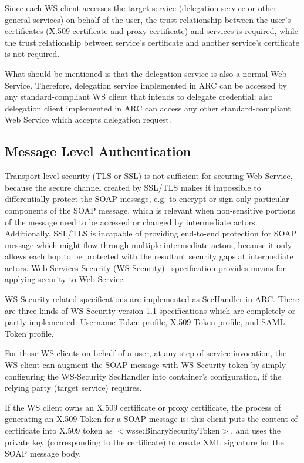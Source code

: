 \documentclass[twocolumn]{svjour3}         %
\begin{document}
Since each WS client accesses the target service (delegation service or other general services) on behalf of the user, the trust relationship between the user's certificates (X.509 certificate and proxy certificate) and services is required, while the trust relationship between service's certificate and another service's certificate is not required.

What should be mentioned is that the delegation service is also a normal Web Service. Therefore, delegation service implemented in ARC can be accessed by any standard-compliant WS client that intends to delegate credential; also delegation client implemented in ARC can access any other standard-compliant Web Service which accepts delegation request.

\subsection{Message Level Authentication}
\label{sec:msgauthn}
Transport level security (TLS or SSL) is not sufficient for securing Web Service, because the secure channel created by SSL/TLS makes it impossible to differentially protect the SOAP message, e.g. to encrypt or sign only particular components of the SOAP message, which is relevant when non-sensitive portions of the message need to be accessed or changed by intermediate actors. Additionally, SSL/TLS is incapable of providing end-to-end protection for SOAP message which might flow through multiple intermediate actors, because it only allows each hop to be protected with the resultant security gaps at intermediate actors. Web Services Security (WS-Security)~\cite{WSSeclink} specification provides means for applying security to Web Service.

WS-Security related specifications are implemented as SecHandler in ARC. There are three kinds of WS-Security version 1.1 specifications which are completely or partly implemented: Username Token profile, X.509 Token profile, and SAML Token profile.

For those WS clients on behalf of a user, at any step of service invocation, the WS client can augment the SOAP message with WS-Security token by simply configuring the WS-Security SecHandler into container’s configuration, if the relying party (target service) requires.

If the WS client owns an X.509 certificate or proxy certificate, the process of generating an X.509 Token for a SOAP message is: this client puts the content of certificate into X.509 token as $<$wsse:BinarySecurityToken$>$, and uses the private key (corresponding to the certificate) to create XML signature for the SOAP message body.
\end{document}
